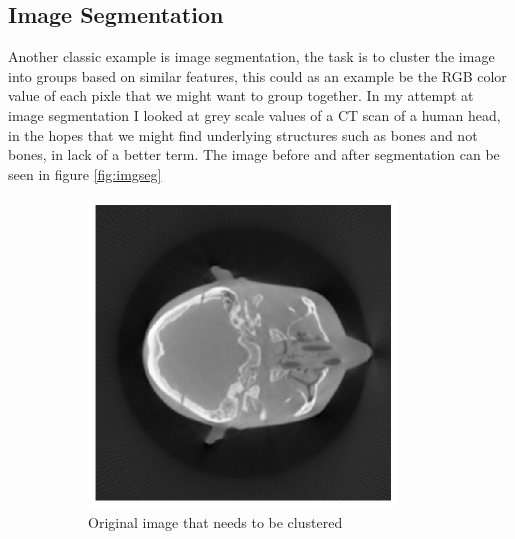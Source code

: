 \documentclass[12pt]{report}
\begin{document}
\subsection{Image Segmentation}
\label{subsec:imgseg}
Another classic example is image segmentation, the task is to cluster the image into groups based on similar features, this could as an example be the RGB color value of each pixle that we might want to group together. In my attempt at image segmentation I looked at grey scale values of a CT scan of a human head, in the hopes that we might find underlying structures such as bones and not bones, in lack of a better term. The image before and after segmentation can be seen in figure \ref{fig:imgseg}

\begin{figure}[h]
    \centering
    \begin{subfigure}[t]{0.5\textwidth}
        \centering
        \includegraphics[width=0.9\textwidth]{images/brain512.png}
        \caption{Original image that needs to be clustered }
    \end{subfigure}%
    ~
    \begin{subfigure}[t]{0.5\textwidth}
        \centering

\end{subfigure}
\end{figure}
\end{document}

